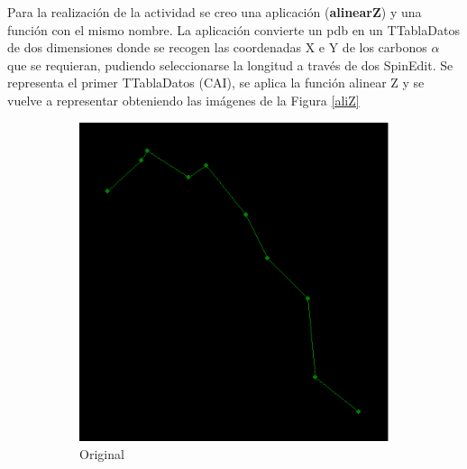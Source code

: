 \documentclass[a4paper,11pt]{report}
\begin{document}
 Para la realización de la actividad se creo una aplicación (\textbf{alinearZ}) y una función con el mismo nombre. La aplicación convierte un pdb en un TTablaDatos de dos dimensiones donde se recogen las coordenadas X e Y de los carbonos $\alpha$ que se requieran, pudiendo seleccionarse la longitud a través de dos SpinEdit.
 Se representa el primer TTablaDatos (CAI), se aplica la función alinear Z y se vuelve a representar obteniendo las imágenes de la Figura \ref{aliZ}
 
   \begin{figure}[h!]
 	\centering
 	\begin{subfigure}{0.45\textwidth}
 		\includegraphics[width=\linewidth]{Figuras/Figura33}
 		\caption{Original}
 	\end{subfigure}   
 	\begin{subfigure}{0.45\textwidth}

\end{subfigure}
\end{figure}
\end{document}
